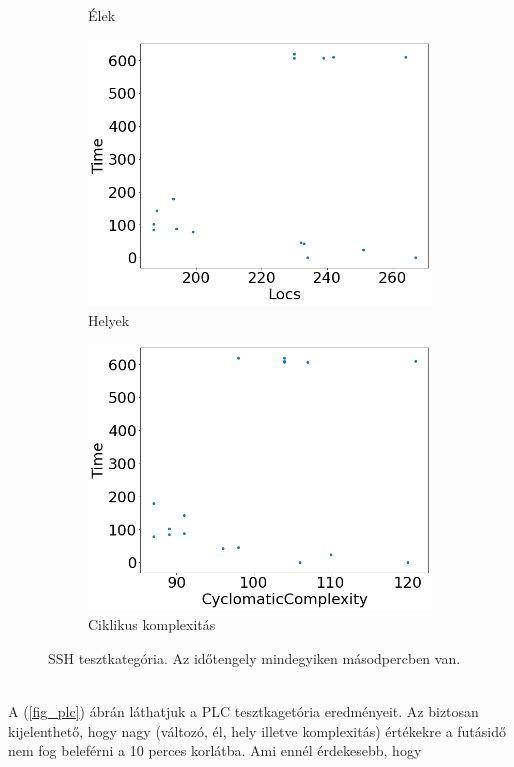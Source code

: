 \begin{figure}[ht]
\begin{subfigure}[b]{0.5\linewidth}
		\caption{Élek} 
		\label{fig7:b} 
		\vspace{4ex}
	\end{subfigure} 
	\begin{subfigure}[b]{0.5\linewidth}
		\centering
		\includegraphics[width=0.95\linewidth]{figures/ssh/locs.png} 
		\caption{Helyek} 
		\label{fig7:c} 
	\end{subfigure}%
	\begin{subfigure}[b]{0.5\linewidth}
		\centering
		\includegraphics[width=0.95\linewidth]{figures/ssh/cc.png} 
		\caption{Ciklikus komplexitás} 
		\label{fig7:d} 
	\end{subfigure} 
	\caption{SSH tesztkategória. Az időtengely mindegyiken másodpercben van.}
	\label{fig_ssh} 
\end{figure}
\ \\
A (\ref{fig_plc}) ábrán láthatjuk a PLC tesztkagetória eredményeit. Az biztosan kijelenthető, hogy nagy (változó, él, hely illetve komplexitás) értékekre a futásidő nem fog beleférni a 10 perces korlátba. Ami ennél érdekesebb, hogy 

